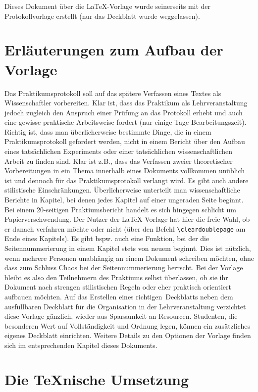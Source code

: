 Dieses Dokument über die LaTeX-Vorlage wurde seinerseits mit der Protokollvorlage erstellt (nur das Deckblatt wurde weggelassen).

\section{Erläuterungen zum Aufbau der Vorlage}
Das Praktikumsprotokoll soll auf das spätere Verfassen eines Textes als Wissenschaftler vorbereiten. Klar ist, dass das Praktikum als Lehrveranstaltung jedoch zugleich den Anspruch einer Prüfung an das Protokoll erhebt und auch eine gewisse praktische Arbeitsweise fordert (nur einige Tage Bearbeitungszeit). Richtig ist, dass man überlicherweise bestimmte Dinge, die in einem Praktikumsprotokoll gefordert werden, nicht in einem Bericht über den Aufbau eines tatsächlichen Experiments oder einer tatsächlichen wissenschaftlichen Arbeit zu finden sind. Klar ist z.B., dass das Verfassen zweier theoretischer Vorbereitungen in ein Thema innerhalb eines Dokuments vollkommen unüblich ist und dennoch für das Praktikumsprotokoll verlangt wird. Es gibt auch andere stilistische Einschränkungen. Überlicherweise unterteilt man wissenschaftliche Berichte in Kapitel, bei denen jedes Kapitel auf einer ungeraden Seite beginnt. Bei einem 20-seitigen Praktiumsbericht handelt es sich hingegen schlicht um Papierverschwendung. Der Nutzer der LaTeX-Vorlage hat hier die freie Wahl, ob er danach verfahren möchte oder nicht (über den Befehl \verb|\cleardoublepage| am Ende eines Kapitels). Es gibt bspw. auch eine Funktion, bei der die Seitennummerierung in einem Kapitel stets von neuem beginnt. Dies ist nützlich, wenn mehrere Personen unabhängig an einem Dokument schreiben möchten, ohne dass zum Schluss Chaos bei der Seitennummerierung herrscht. Bei der Vorlage bleibt es also den Teilnehmern des Praktiums selbst überlassen, ob sie ihr Dokument nach strengen stilistischen Regeln oder eher praktisch orientiert aufbauen möchten. Auf das Erstellen eines \glqq richtigen\grqq\ Deckblatts neben dem ausfüllbaren Deckblatt für die Organisation in der Lehrveranstaltung verzichtet diese Vorlage gänzlich, wieder aus Sparsamkeit an Resourcen. Studenten, die besonderen Wert auf Vollständigkeit und Ordnung legen, können ein zusätzliches eigenes Deckblatt einrichten. Weitere Details zu den Optionen der Vorlage finden sich im entsprechenden Kapitel dieses Dokuments.



\section{Die TeXnische Umsetzung}
